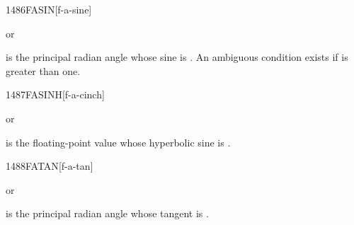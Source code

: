 \begin{worddef}{1486}{FASIN}[f-a-sine]
\item {} or

	 is the principal radian angle whose sine is .
	An ambiguous condition exists if  is greater than one.
\end{worddef}



\begin{worddef}{1487}{FASINH}[f-a-cinch]
\item {} or

	 is the floating-point value whose hyperbolic sine is
	.
\end{worddef}


\begin{worddef}{1488}{FATAN}[f-a-tan]
\item {} or

	 is the principal radian angle whose tangent is
	.
\end{worddef}


